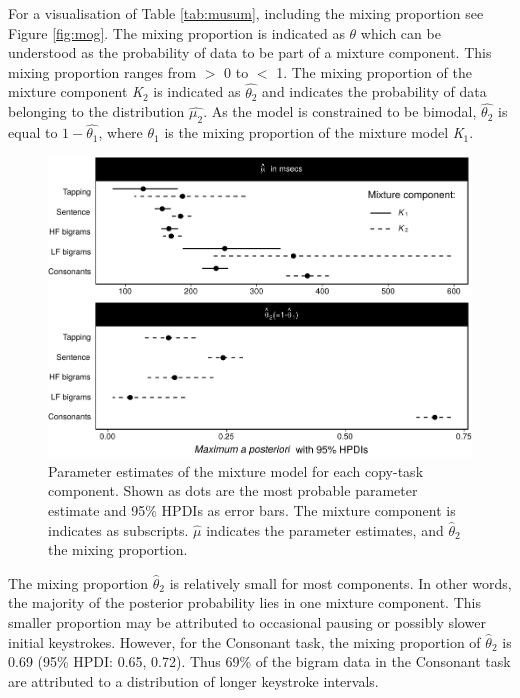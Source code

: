 \documentclass[,man,floatsintext]{apa6}
\begin{document}
For a visualisation of Table \ref{tab:musum}, including the mixing proportion see Figure \ref{fig:mog}. The mixing proportion is indicated as \(\theta\) which can be understood as the probability of data to be part of a mixture component. This mixing proportion ranges from \(>\) 0 to \(<\) 1. The mixing proportion of the mixture component \textit{K}\(_2\) is indicated as \(\hat{\theta_2}\) and indicates the probability of data belonging to the distribution \(\hat{\mu_2}\). As the model is constrained to be bimodal, \(\hat{\theta_2}\) is equal to \(1-\hat{\theta_1}\), where \(\theta_1\) is the mixing proportion of the mixture model \textit{K}\(_1\).

\begin{figure}[!h]

{\centering \includegraphics{ct_files/figure-latex/fig3-1} 

}

\caption{\label{fig:mog}Parameter estimates of the mixture model for each copy-task component. Shown as dots are the most probable parameter estimate and 95\% HPDIs as error bars. The mixture component is indicates as subscripts. $\hat\mu$ indicates the parameter estimates, and $\hat\theta_2$ the mixing proportion.}\label{fig:fig3}
\end{figure}

The mixing proportion \(\hat\theta_2\) is relatively small for most components. In other words, the majority of the posterior probability lies in one mixture component. This smaller proportion may be attributed to occasional pausing or possibly slower initial keystrokes. However, for the Consonant task, the mixing proportion of \(\hat\theta_2\) is 0.69 (95\% HPDI: 0.65, 0.72). Thus 69\% of the bigram data in the Consonant task are attributed to a distribution of longer keystroke intervals.
\end{document}
